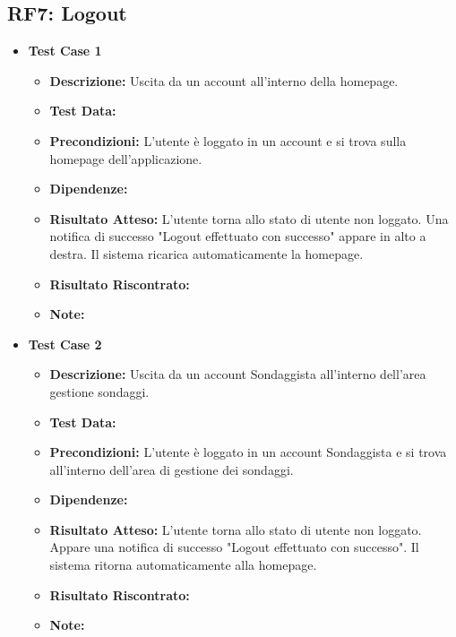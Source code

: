     \subsection{RF7: Logout}
        \begin{itemize}
            \item \textbf{Test Case 1}
                \begin{itemize}
                    \item \textbf{Descrizione:} Uscita da un account all'interno della homepage.
                    \item \textbf{Test Data:}
                    \item \textbf{Precondizioni:} L'utente è loggato in un account e si trova sulla homepage dell'applicazione.
                    \item \textbf{Dipendenze:}
                    \item \textbf{Risultato Atteso:} L'utente torna allo stato di utente non loggato. Una notifica di successo "Logout effettuato con successo" appare in alto a destra. Il sistema ricarica automaticamente la homepage.
                    \item \textbf{Risultato Riscontrato:} 
                    \item \textbf{Note:}
                \end{itemize}
            \item \textbf{Test Case 2}
                \begin{itemize}
                    \item \textbf{Descrizione:} Uscita da un account Sondaggista all'interno dell'area gestione sondaggi.
                    \item \textbf{Test Data:}
                    \item \textbf{Precondizioni:} L'utente è loggato in un account Sondaggista e si trova all'interno dell'area di gestione dei sondaggi.
                    \item \textbf{Dipendenze:}
                    \item \textbf{Risultato Atteso:} L'utente torna allo stato di utente non loggato. Appare una notifica di successo "Logout effettuato con successo". Il sistema ritorna automaticamente alla homepage.
                    \item \textbf{Risultato Riscontrato:}
                    \item \textbf{Note:}
                \end{itemize}                

\end{itemize}
